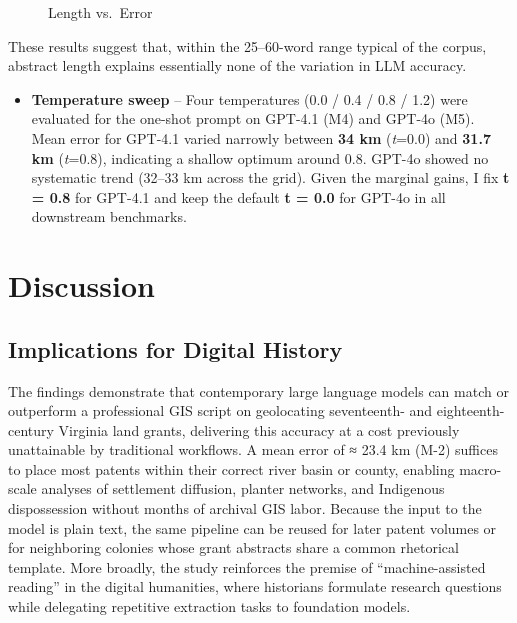 \begin{figure}
\centering
{}
\caption{Length vs.~Error}\label{fig:length-vs-error}
\end{figure}

These results suggest that, within the 25--60-word range typical of the
corpus, abstract length explains essentially none of the variation in
LLM accuracy.

\begin{itemize}
\tightlist
\item
  \textbf{Temperature sweep} -- Four temperatures (0.0 / 0.4 / 0.8 /
  1.2) were evaluated for the one-shot prompt on GPT-4.1 (M4) and GPT-4o
  (M5). Mean error for GPT-4.1 varied narrowly between \textbf{34 km}
  (\emph{t}=0.0) and \textbf{31.7 km} (\emph{t}=0.8), indicating a
  shallow optimum around 0.8. GPT-4o showed no systematic trend (32--33
  km across the grid). Given the marginal gains, I fix \textbf{t = 0.8}
  for GPT-4.1 and keep the default \textbf{t = 0.0} for GPT-4o in all
  downstream benchmarks.
\end{itemize}

\section{Discussion}\label{discussion}

\subsection{Implications for Digital
History}\label{implications-for-digital-history}

The findings demonstrate that contemporary large language models can
match or outperform a professional GIS script on geolocating
seventeenth- and eighteenth-century Virginia land grants, delivering
this accuracy at a cost previously unattainable by traditional
workflows. A mean error of ≈ 23.4 km (M-2) suffices to place most
patents within their correct river basin or county, enabling macro-scale
analyses of settlement diffusion, planter networks, and Indigenous
dispossession without months of archival GIS labor. Because the input to
the model is plain text, the same pipeline can be reused for later
patent volumes or for neighboring colonies whose grant abstracts share a
common rhetorical template. More broadly, the study reinforces the
premise of ``machine-assisted reading'' in the digital humanities, where
historians formulate research questions while delegating repetitive
extraction tasks to foundation models.

